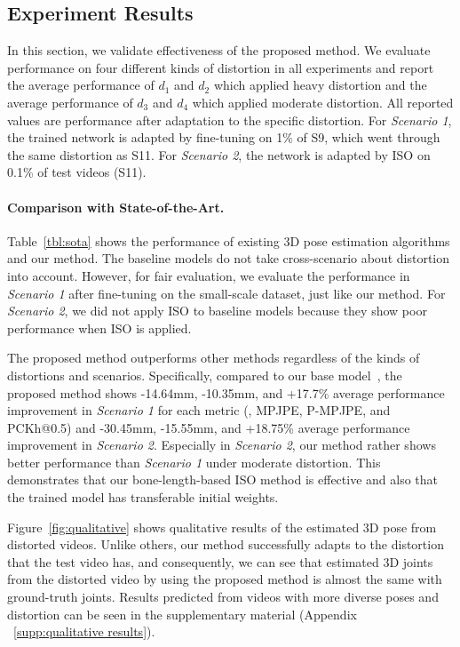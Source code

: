     \subsection{Experiment Results}
        \label{sec:experiment results}
        \vspace{-1mm}
        In this section, we validate effectiveness of the proposed method. We evaluate performance on four different kinds of distortion in all experiments and report the average performance of $d_1$ and $d_2$ which applied heavy distortion and the average performance of $d_3$ and $d_4$ which applied moderate distortion. All reported values are performance after adaptation to the specific distortion. For \textit{Scenario 1}, the trained network is adapted by fine-tuning on 1\% of S9, which went through the same distortion as S11. For \textit{Scenario 2}, the network is adapted by ISO on 0.1\% of test videos (S11).
        \vspace{-3mm}
        \vspace{-2mm}
        \paragraph{Comparison with State-of-the-Art.}
            Table~\ref{tbl:sota} shows the performance of existing 3D pose estimation algorithms and our method. The baseline models do not take cross-scenario about distortion into account. However, for fair evaluation, we evaluate the performance in \textit{Scenario 1} after fine-tuning on the small-scale dataset, just like our method. For \textit{Scenario 2}, we did not apply ISO to baseline models because they show poor performance when ISO is applied.
        
            The proposed method outperforms other methods regardless of the kinds of distortions and scenarios. Specifically, compared to our base model~\cite{ref9_pavllo20193d}, the proposed method shows -14.64mm, -10.35mm, and +17.7\% average performance improvement in \textit{Scenario 1} for each metric (\ie, MPJPE, P-MPJPE, and PCKh@0.5) and -30.45mm, -15.55mm, and +18.75\% average performance improvement in \textit{Scenario 2}. Especially in \textit{Scenario 2}, our method rather shows better performance than \textit{Scenario 1} under moderate distortion. This demonstrates that our bone-length-based ISO method is effective and also that the trained model has transferable initial weights.
        
            Figure~\ref{fig:qualitative} shows qualitative results of the estimated 3D pose from distorted videos. Unlike others, our method successfully adapts to the distortion that the test video has, and consequently, we can see that estimated 3D joints from the distorted video by using the proposed method is almost the same with ground-truth joints. Results predicted from videos with more diverse poses and distortion can be seen in the supplementary material (Appendix ~\ref{supp:qualitative results}).

